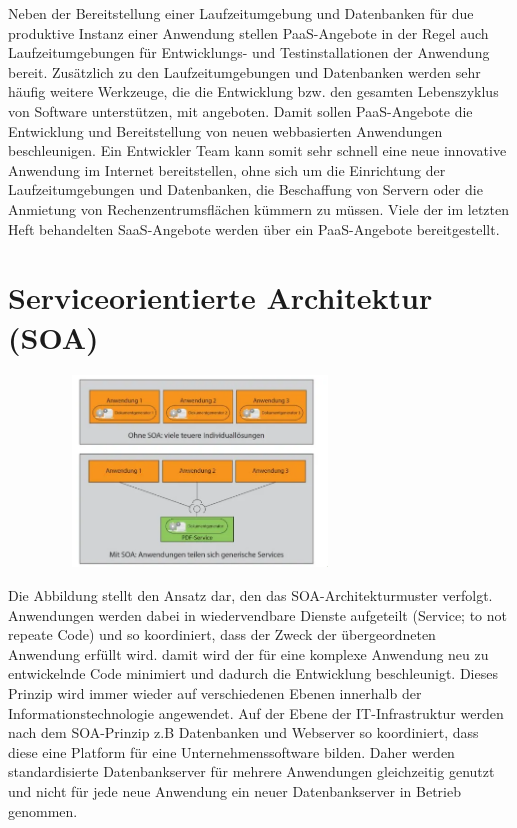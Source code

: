\documentclass[a4paper,10pt]{article}
\begin{document}
\vspace{3mm}
Neben der Bereitstellung einer Laufzeitumgebung und Datenbanken für due produktive Instanz einer Anwendung stellen PaaS-Angebote in der Regel auch Laufzeitumgebungen für Entwicklungs- und Testinstallationen der Anwendung bereit. Zusätzlich zu den Laufzeitumgebungen und Datenbanken werden sehr häufig weitere Werkzeuge, die die Entwicklung bzw. den gesamten Lebenszyklus von Software unterstützen, mit angeboten. Damit sollen PaaS-Angebote die Entwicklung und Bereitstellung von neuen webbasierten Anwendungen beschleunigen. Ein Entwickler Team kann somit sehr schnell eine neue innovative Anwendung im Internet bereitstellen, ohne sich um die Einrichtung der Laufzeitumgebungen und Datenbanken, die Beschaffung von Servern oder die Anmietung von Rechenzentrumsflächen kümmern zu müssen. Viele der im letzten Heft behandelten SaaS-Angebote werden über ein PaaS-Angebote bereitgestellt.

\section{Serviceorientierte Architektur (SOA)}
\begin{center}
	\includegraphics[width=4in,height=2in]{soa.png}
\end{center}
Die Abbildung stellt den Ansatz dar, den das SOA-Architekturmuster verfolgt. Anwendungen werden dabei in wiedervendbare Dienste aufgeteilt (Service; to not repeate Code) und so koordiniert, dass der Zweck der übergeordneten Anwendung erfüllt wird. damit wird der für eine komplexe Anwendung neu zu entwickelnde Code minimiert und dadurch die Entwicklung beschleunigt. Dieses Prinzip wird immer wieder auf verschiedenen Ebenen innerhalb der Informationstechnologie angewendet. Auf der Ebene der IT-Infrastruktur werden nach dem SOA-Prinzip z.B Datenbanken und Webserver so koordiniert, dass diese eine Platform für eine Unternehmenssoftware bilden. Daher werden standardisierte Datenbankserver für mehrere Anwendungen gleichzeitig genutzt und nicht für jede neue Anwendung ein neuer Datenbankserver in Betrieb genommen. \newline
\end{document}
